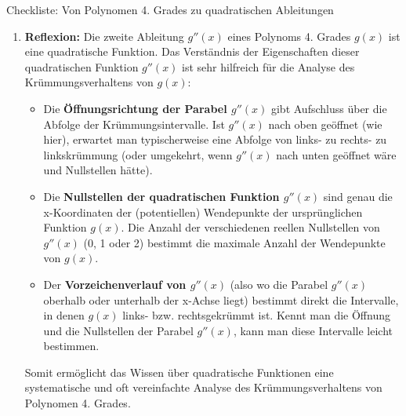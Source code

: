 \begin{loesungsumgebung}{Checkliste: Von Polynomen 4. Grades zu quadratischen Ableitungen}
\begin{enumerate}[label=(\alph*)]
    \item \textbf{Reflexion:}
    Die zweite Ableitung $g''(x)$ eines Polynoms 4. Grades $g(x)$ ist eine quadratische Funktion. Das Verständnis der Eigenschaften dieser quadratischen Funktion $g''(x)$ ist sehr hilfreich für die Analyse des Krümmungsverhaltens von $g(x)$:
    \begin{itemize}
        \item Die \textbf{Öffnungsrichtung der Parabel $g''(x)$} gibt Aufschluss über die Abfolge der Krümmungsintervalle. Ist $g''(x)$ nach oben geöffnet (wie hier), erwartet man typischerweise eine Abfolge von links- zu rechts- zu linkskrümmung (oder umgekehrt, wenn $g''(x)$ nach unten geöffnet wäre und Nullstellen hätte).
        \item Die \textbf{Nullstellen der quadratischen Funktion $g''(x)$} sind genau die x-Koordinaten der (potentiellen) Wendepunkte der ursprünglichen Funktion $g(x)$. Die Anzahl der verschiedenen reellen Nullstellen von $g''(x)$ (0, 1 oder 2) bestimmt die maximale Anzahl der Wendepunkte von $g(x)$.
        \item Der \textbf{Vorzeichenverlauf von $g''(x)$} (also wo die Parabel $g''(x)$ oberhalb oder unterhalb der x-Achse liegt) bestimmt direkt die Intervalle, in denen $g(x)$ links- bzw. rechtsgekrümmt ist. Kennt man die Öffnung und die Nullstellen der Parabel $g''(x)$, kann man diese Intervalle leicht bestimmen.
    \end{itemize}
    Somit ermöglicht das Wissen über quadratische Funktionen eine systematische und oft vereinfachte Analyse des Krümmungsverhaltens von Polynomen 4. Grades.
\end{enumerate}

\end{loesungsumgebung}




